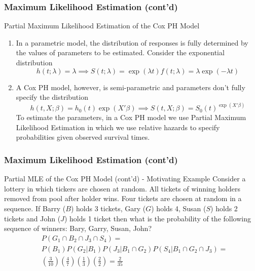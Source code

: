\documentclass{beamer}
\theoremstyle{definition}
\begin{document}
\begin{frame}
\frametitle{Maximum Likelihood Estimation (cont'd)}
\begin{block}{Partial Maximum Likelihood Estimation of the Cox PH Model} 
\begin{enumerate}
\item In a parametric model, the distribution of responses is fully determined by the values of parameters to be estimated. Consider the exponential distribution
\[
h(t;\lambda) = \lambda \implies S(t;\lambda) = \exp(\lambda t) f(t;\lambda) = \lambda \exp(-\lambda t)
\]
\item A Cox PH model, however, is semi-parametric and parameters don't fully specify the distribution
\[
h(t,X;\beta) = h_0(t)\exp(X'\beta) \implies S(t,X;\beta)= S_0(t)^{\exp(X'\beta)} 
\]
To estimate the parameters, in a Cox PH model we use Partial Maximum Likelihood Estimation in which we use relative hazards to specify probabilities given observed survival times. 
\end{enumerate}  
\end{block}
\end{frame} 

\begin{frame} 
\frametitle{Maximum Likelihood Estimation (cont'd)}
\begin{block}{Partial MLE of the Cox PH Model (cont'd) - Motivating Example} 
Consider a lottery in which tickers are chosen at random. All tickets of winning holders removed from pool after holder wins. Four tickets are chosen at random in a sequence. If
Barry ($B$) holds 3 tickets, Gary ($G$) holds 4, Susan ($S$) holds 2 tickets and John ($J$) holds 1 ticket then what is the probability of the following sequence of winners: Bary, Garry, Susan, John? 
\begin{align*} 
& P(G_1 \cap B_2 \cap J_3 \cap S_4) = \\
& P(B_1)P(G_2|B_1)P(J_3|B_1 \cap G_2)P(S_4|B_1 \cap G_2 \cap J_3) = \\
& \left(\frac{3}{10}\right) \left(\frac{4}{7}\right) \left(\frac{1}{3}\right) \left(\frac{2}{2}\right) = \frac{2}{35}
\end{align*} 
\end{block}
\end{frame} 
\end{document}
